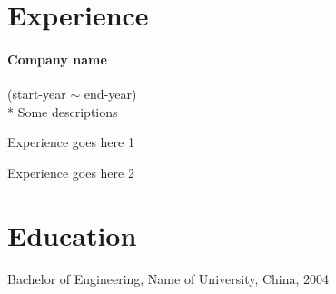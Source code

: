 \documentclass[a4paper,11pt]{article}
\begin{document}
\section*{Experience}

\paragraph{Company name} (start-year $\sim$ end-year) \\*
Some descriptions
\begin{itemize*}
    \setlength\itemsep{0.4em}
  \item Experience goes here 1
  \item Experience goes here 2
\end{itemize*}

\section*{Education}
Bachelor of Engineering, Name of University, China, 2004

\begin{comment}
\begin{tabular}{l l}
  Duration:   & start - end \\
  University: & Name of University \\
  Degree:     & Bachelor of Engineering \\
  Major:      & My major subject \\
  Minor:      & My minor subject \\
  Country:    & My country \\
\end{tabular}
\end{comment}
\end{document}

